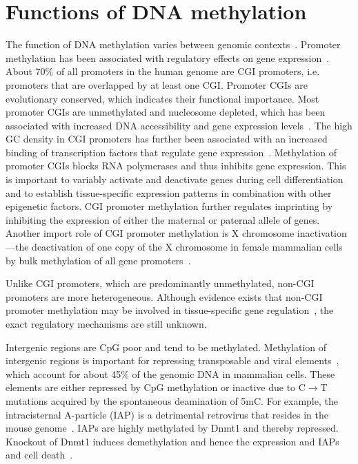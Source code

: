\section{Functions of DNA methylation} \label{sec:intro_fun}

The function of DNA methylation varies between genomic contexts~\citep{bestor_notes_2015,moore_dna_2013,jones_functions_2012,bird_dna_2002}. Promoter methylation has been associated with regulatory effects on gene expression~\citep{moore_dna_2013,jones_functions_2012,bird_dna_2002}. About 70\% of all promoters in the human genome are CGI promoters, i.e. promoters that are overlapped by at least one CGI. Promoter CGIs are evolutionary conserved, which indicates their functional importance. Most promoter CGIs are unmethylated and nucleosome depleted, which has been associated with increased DNA accessibility and gene expression levels~\citep{moore_dna_2013}. The high GC density in CGI promoters has further been associated with an increased binding of transcription factors that regulate gene expression~\citep{moore_dna_2013}. Methylation of promoter CGIs blocks RNA polymerases and thus inhibits gene expression. This is important to variably activate and deactivate genes during cell differentiation and to establish tissue-specific expression patterns in combination with other epigenetic factors. CGI promoter methylation further regulates imprinting by inhibiting the expression of either the maternal or paternal allele of genes. Another import role of CGI promoter methylation is X chromosome inactivation—the deactivation of one copy of the X chromosome in female mammalian cells by bulk methylation of all gene promoters~\citep{bestor_notes_2015}.

Unlike CGI promoters, which are predominantly unmethylated, non-CGI promoters are more heterogeneous. Although evidence exists that non-CGI promoter methylation may be involved in tissue-specific gene regulation~\citep{moore_dna_2013,jones_functions_2012}, the exact regulatory mechanisms are still unknown.

Intergenic regions are CpG poor and tend to be methylated. Methylation of intergenic regions is important for repressing transposable and viral elements~\citep{moore_dna_2013,jones_functions_2012,robertson_dna_2005}, which account for about 45\% of the genomic DNA in mammalian cells. These elements are either repressed by CpG methylation or inactive due to C$\rightarrow$T mutations acquired by the spontaneous deamination of 5mC. For example, the intracisternal A-particle (IAP) is a detrimental retrovirus that resides in the mouse genome~\citep{walsh_cytosine_1999}. IAPs are highly methylated by Dnmt1 and thereby repressed. Knockout of Dnmt1 induces demethylation and hence the expression and IAPs and cell death~\citep{walsh_cytosine_1999,hutnick_repression_2010}.

